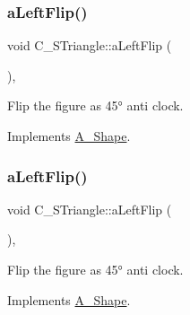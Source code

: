 \mbox{\label{classC__STriangle_aff480b9ec706ee5ae58f6f78318e2728}} 
\subsubsection{\texorpdfstring{a\+Left\+Flip()}{aLeftFlip()}\hspace{0.1cm}{\footnotesize\ttfamily [1/2]}}
{\footnotesize\ttfamily void C\+\_\+\+S\+Triangle\+::a\+Left\+Flip (\begin{DoxyParamCaption}{ }\end{DoxyParamCaption})\hspace{0.3cm}{\ttfamily [override]}, {\ttfamily [virtual]}}



Flip the figure as 45° anti clock. 



Implements \hyperlink{classA__Shape_abe947e7003cb63be2b4f6c439533427d}{A\+\_\+\+Shape}.

\mbox{\label{classC__STriangle_aff480b9ec706ee5ae58f6f78318e2728}} 
\subsubsection{\texorpdfstring{a\+Left\+Flip()}{aLeftFlip()}\hspace{0.1cm}{\footnotesize\ttfamily [2/2]}}
{\footnotesize\ttfamily void C\+\_\+\+S\+Triangle\+::a\+Left\+Flip (\begin{DoxyParamCaption}{ }\end{DoxyParamCaption})\hspace{0.3cm}{\ttfamily [override]}, {\ttfamily [virtual]}}



Flip the figure as 45° anti clock. 



Implements \hyperlink{classA__Shape_abe947e7003cb63be2b4f6c439533427d}{A\+\_\+\+Shape}.

\mbox{\label{classC__STriangle_a82a3c3a847ca6c2d5922921150fa50b5}} 
